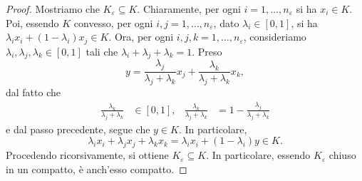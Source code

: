 \begin{proof}
	Mostriamo che $K_\varepsilon \subseteq K$. Chiaramente, per ogni $i= 1,\dots, n_\varepsilon$ si ha $x_i \in K$. Poi, essendo $K$ convesso, per ogni $i,j = 1,\dots,n_\varepsilon$, dato $\lambda_i \in [0,1]$, si ha $\lambda_ix_i +(1-\lambda_i)x_j \in K$. Ora, per ogni $i,j,k=1,\dots,n_\varepsilon$, consideriamo $\lambda_i,\lambda_j,\lambda_k \in [0,1]$ tali che $\lambda_i + \lambda_j + \lambda_k = 1$. Preso
	\[ y = \frac{\lambda_j}{\lambda_j + \lambda_k}x_j + \frac{\lambda_k}{\lambda_j + \lambda_k}x_k, \]
	dal fatto che 
	\begin{align*}
		\frac{\lambda_k}{\lambda_j + \lambda_k} &\in [0,1], & \frac{\lambda_k}{\lambda_j + \lambda_k} &= 1 - \frac{\lambda_j}{\lambda_j + \lambda_k}
	\end{align*}
	e dal passo precedente, segue che $y \in K$. In particolare, 
	\[ \lambda_i x_i + \lambda_j x_j + \lambda_k x_k = \lambda_i x_i + (1-\lambda_i)y \in K.\]
	Procedendo ricorsivamente, si ottiene $K_\varepsilon \subseteq K$. In particolare, essendo $K_\varepsilon$ chiuso in un compatto, è anch'esso compatto.
	

\end{proof}
